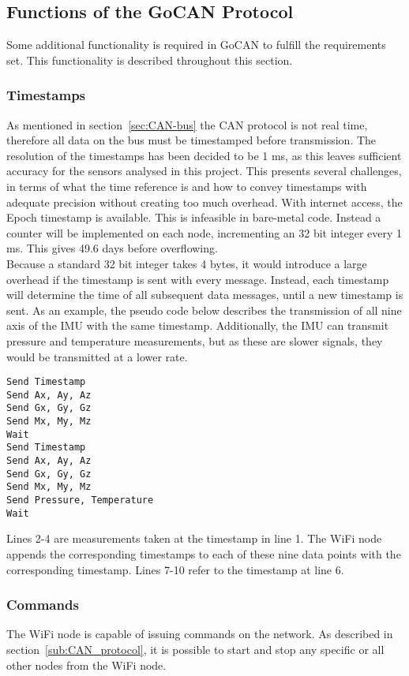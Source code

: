 \subsection{Functions of the GoCAN Protocol}\label{sec:CAN_functions}
Some additional functionality is required in GoCAN to fulfill the requirements set.
This functionality is described throughout this section.

\subsubsection*{Timestamps}
As mentioned in section~\ref{sec:CAN-bus} the CAN protocol is not real time, therefore all data on the bus must be timestamped before transmission. 
The resolution of the timestamps has been decided to be 1 ms, as this leaves sufficient accuracy for the sensors analysed in this project.
This presents several challenges, in terms of what the time reference is and how to convey timestamps with adequate precision without creating too much overhead.
With internet access, the Epoch timestamp is available. 
This is infeasible in bare-metal code.
Instead a counter will be implemented on each node, incrementing an 32 bit integer every 1 ms.
This gives 49.6 days before overflowing.\\

Because a standard 32 bit integer takes 4 bytes, it would introduce a large overhead if the timestamp is sent with every message. 
Instead, each timestamp will determine the time of all subsequent data messages, until a new timestamp is sent. 
As an example, the pseudo code below describes the transmission of all nine axis of the IMU with the same timestamp.
Additionally, the IMU can transmit pressure and temperature measurements, but as these are slower signals, they would be transmitted at a lower rate.

\begin{lstlisting}
Send Timestamp
Send Ax, Ay, Az
Send Gx, Gy, Gz
Send Mx, My, Mz
Wait
Send Timestamp
Send Ax, Ay, Az
Send Gx, Gy, Gz
Send Mx, My, Mz
Send Pressure, Temperature
Wait
\end{lstlisting}

Lines 2-4 are measurements taken at the timestamp in line 1.
The WiFi node appends the corresponding timestamps to each of these nine data points with the corresponding timestamp.
Lines 7-10 refer to the timestamp at line 6.

\subsubsection*{Commands}
The WiFi node is capable of issuing commands on the network.
As described in section~\ref{sub:CAN_protocol}, it is possible to start and stop any specific or all other nodes from the WiFi node.

